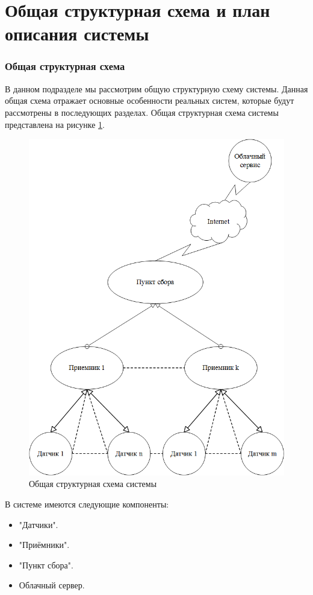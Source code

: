 \section{Общая структурная схема и план описания системы}
\subsubsection{Общая структурная схема}\label{7.1}
В данном подразделе мы рассмотрим общую структурную схему системы. Данная общая схема отражает основные особенности реальных систем, которые будут рассмотрены в последующих разделах.
Общая структурная схема системы представлена на рисунке 
\ref{fig:common_chart}.

\begin{figure}[H]
	\centering\includegraphics[width=0.7\linewidth]{img/common_chart}
	\caption{Общая структурная схема системы}
	\label{fig:common_chart}
\end{figure}

В системе имеются следующие компоненты: 
\begin{itemize}
	\item "Датчики".
	\item "Приёмники". 
	\item "Пункт сбора".
	\item Облачный сервер.
\end{itemize}

